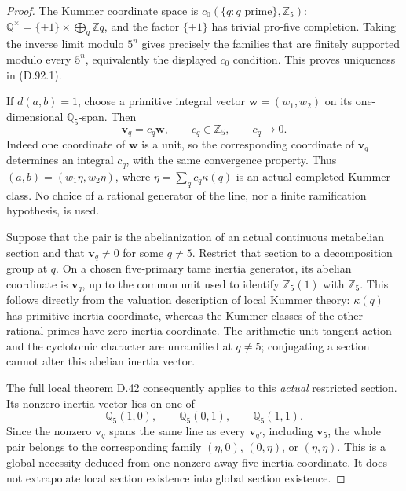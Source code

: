 \begin{proof}
The Kummer coordinate space is
\(c_0(\{q:q\text{ prime}\},\mathbb Z_5)\):
\(\mathbb Q^\times=\{\pm1\}\times\bigoplus_q\mathbb Z q\),
and the factor \(\{\pm1\}\) has trivial pro-five
completion. Taking the inverse limit modulo \(5^n\)
gives precisely the families that are finitely supported
modulo every \(5^n\), equivalently the displayed \(c_0\)
condition. This proves uniqueness in (D.92.1).

If \(d(a,b)=1\), choose a primitive integral vector
\(\mathbf w=(w_1,w_2)\) on its one-dimensional
\(\mathbb Q_5\)-span. Then
\[
                  \mathbf v_q=c_q\mathbf w,
                   \qquad c_q\in\mathbb Z_5,
                   \qquad c_q\longrightarrow0.                \tag{D.92.6}
\]
Indeed one coordinate of \(\mathbf w\) is a unit,
so the corresponding coordinate of \(\mathbf v_q\)
determines an integral \(c_q\), with the same convergence
property. Thus \((a,b)=(w_1\eta,w_2\eta)\), where
\(\eta=\sum_qc_q\kappa(q)\) is an actual completed
Kummer class. No choice of a rational generator of the
line, nor a finite ramification hypothesis, is used.

Suppose that the pair is the abelianization of an actual
continuous metabelian section and that
\(\mathbf v_q\ne0\) for some \(q\ne5\).
Restrict that section to a decomposition group at \(q\).
On a chosen five-primary tame inertia generator, its
abelian coordinate is \(\mathbf v_q\), up to the common
unit used to identify \(\mathbb Z_5(1)\) with \(\mathbb Z_5\).
This follows directly from the valuation description of
local Kummer theory: \(\kappa(q)\) has primitive inertia
coordinate, whereas the Kummer classes of the other
rational primes have zero inertia coordinate. The
arithmetic unit-tangent action and the cyclotomic character
are unramified at \(q\ne5\); conjugating a section cannot
alter this abelian inertia vector.

The full local theorem D.42 consequently applies to this
\emph{actual} restricted section. Its nonzero inertia vector
lies on one of
\[
          \mathbb Q_5(1,0),\qquad
          \mathbb Q_5(0,1),\qquad
          \mathbb Q_5(1,1).                                  \tag{D.92.7}
\]
Since the nonzero \(\mathbf v_q\) spans the same line as
every \(\mathbf v_{q'}\), including \(\mathbf v_5\),
the whole pair belongs to the corresponding family
\((\eta,0)\), \((0,\eta)\), or \((\eta,\eta)\).
This is a global necessity deduced from one nonzero
away-five inertia coordinate. It does not extrapolate
local section existence into global section existence.


\end{proof}
